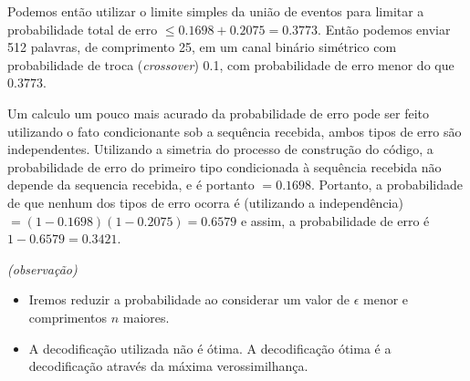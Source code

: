 \begin{frame}[allowframebreaks]
\begin{exercise}
  \examplebreak
  Podemos então utilizar o limite simples da união de eventos para limitar 
  a probabilidade total de erro $\leq 0.1698 + 0.2075 = 0.3773$.
  Então podemos enviar 512 palavras, de comprimento 25, em um canal binário simétrico
  com probabilidade de troca (\emph{crossover}) 0.1, com probabilidade de erro
  menor do que $0.3773$.

  \examplebreak
  Um calculo um pouco mais acurado da probabilidade de erro pode ser feito
  utilizando o fato condicionante sob a sequência recebida, ambos tipos de erro
  são independentes. Utilizando a simetria do processo de construção do código,
  a probabilidade de erro do primeiro tipo condicionada à sequência recebida
  não depende da sequencia recebida, e é portanto $=0.1698$. Portanto, a probabilidade
  de que nenhum dos tipos de erro ocorra é (utilizando a independência) 
  $=(1-0.1698) (1 - 0.2075) = 0.6579$ e assim, a probabilidade de erro é
  $1 - 0.6579 = 0.3421$.

  \examplebreak
  \textit{(observação)}
 
  \begin{itemize}
  \item Iremos reduzir a probabilidade ao considerar um valor de $\epsilon$ menor e 
  comprimentos $n$ maiores. 
  \item A decodificação utilizada não é ótima. A decodificação ótima é a decodificação
  através da máxima verossimilhança.
  \end{itemize}  

 \end{exercise}

\end{frame}



